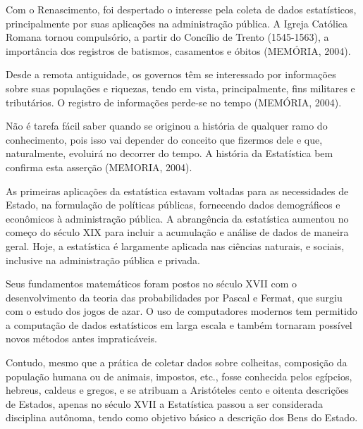 Com o Renascimento, foi despertado o interesse pela coleta de
dados estatísticos, principalmente por suas aplicações na
administração pública. A Igreja Católica Romana tornou compulsório, a partir do Concílio de Trento (1545-1563), a importância dos
registros de batismos, casamentos e óbitos (MEMÓRIA,
2004).\vskip0.3cm



Desde a remota antiguidade, os governos têm se interessado por
informações sobre suas populações e riquezas, tendo em vista,
principalmente, fins militares e tributários. O registro de
informações perde-se no tempo (MEMÓRIA, 2004).\vskip0.3cm


Não é tarefa fácil saber quando se originou a história de qualquer
ramo do conhecimento, pois isso vai depender do conceito que
fizermos dele e que, naturalmente, evoluirá no decorrer do tempo.
A história da Estatística bem confirma esta asserção (MEMORIA,
2004).\vskip0.3cm

As primeiras aplicações da estatística estavam voltadas para as
necessidades de Estado, na formulação de políticas públicas,
fornecendo dados demográficos e e\-co\-nô\-mi\-cos à administração
pública. A abrangência da estatística aumentou no começo do século
XIX para incluir a acumulação e análise de dados de maneira geral.
Hoje, a estatística é largamente aplicada nas ciências naturais, e
sociais, inclusive na administração pública e privada.\vskip0.3cm

Seus fundamentos matemáticos foram postos no século XVII com o
desenvolvimento da teoria das probabilidades por Pascal e Fermat,
que surgiu com o estudo dos jogos de azar. O uso de computadores
modernos tem permitido a computação de dados estatísticos em larga
escala e também tornaram possível novos métodos antes
impraticáveis.\vskip0.3cm


Contudo, mesmo que a prática de coletar dados sobre colheitas,
composição da população humana ou de animais, impostos, etc.,
fosse conhecida pelos egípcios, hebreus, caldeus e gregos, e se
atribuam a Aristóteles cento e oitenta descrições de Estados,
apenas no século XVII a Estatística passou a ser considerada
disciplina autônoma, tendo como objetivo básico a descrição dos
Bens do Estado.\vskip0.3cm





